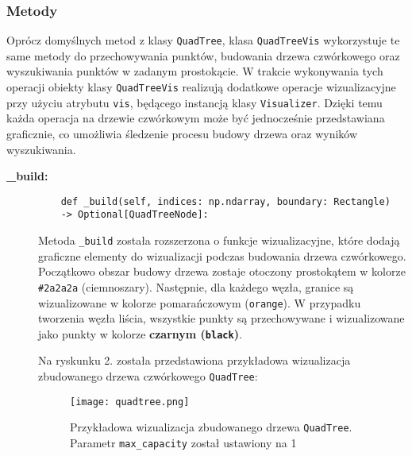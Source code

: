 \documentclass[12pt]{article}
\begin{document}
\subsubsection{Metody}
Oprócz domyślnych metod z klasy \texttt{QuadTree}, klasa \texttt{QuadTreeVis} wykorzystuje te same metody do przechowywania punktów, budowania drzewa czwórkowego oraz wyszukiwania punktów w zadanym prostokącie. W trakcie wykonywania tych operacji obiekty klasy \texttt{QuadTreeVis} realizują dodatkowe operacje wizualizacyjne przy użyciu atrybutu \texttt{vis}, będącego instancją klasy \texttt{Visualizer}. Dzięki temu każda operacja na drzewie czwórkowym może być jednocześnie przedstawiana graficznie, co umożliwia śledzenie procesu budowy drzewa oraz wyników wyszukiwania.

\begin{description}

    \item[\textbf{\_build:}] 
    \begin{verbatim}
    def _build(self, indices: np.ndarray, boundary: Rectangle) 
    -> Optional[QuadTreeNode]:
    \end{verbatim} 
    Metoda \texttt{\_build} została rozszerzona o funkcje wizualizacyjne, które dodają graficzne elementy do wizualizacji podczas budowania drzewa czwórkowego. Początkowo obszar budowy drzewa zostaje otoczony prostokątem w kolorze {\color[HTML]{2a2a2a}\texttt{\#2a2a2a}} (ciemnoszary). Następnie, dla każdego węzła, granice są wizualizowane w kolorze {\color{orange} pomarańczowym (\texttt{orange})}. W przypadku tworzenia węzła liścia, wszystkie punkty są przechowywane i wizualizowane jako punkty w kolorze \textbf{czarnym (\texttt{black})}.


   
\noindent Na ryskunku 2. została przedstawiona przykładowa wizualizacja zbudowanego drzewa czwórkowego \texttt{QuadTree}:

\begin{figure}[h]
    \centering
    \texttt{[image: quadtree.png]}
    \caption{Przykładowa wizualizacja zbudowanego drzewa \texttt{QuadTree}. \\
    Parametr \texttt{max\_capacity} został ustawiony na 1}
    \label{fig:quadtree_visualization_search}
\end{figure}



\end{description}
\end{document}

